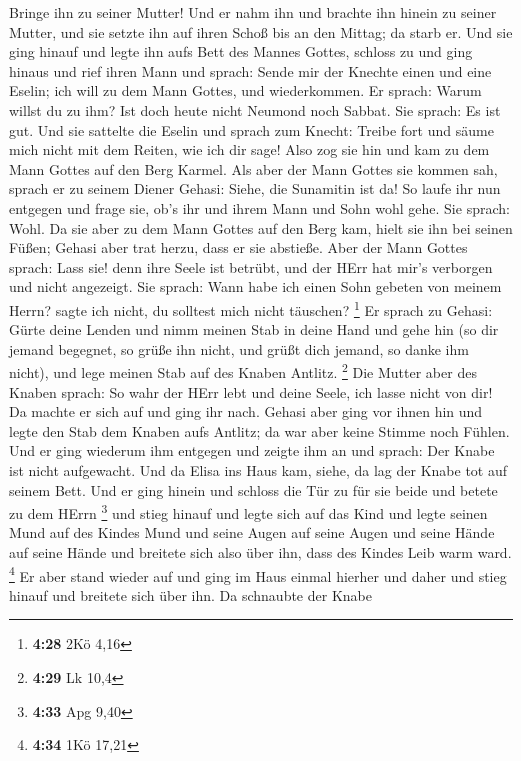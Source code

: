 Bringe ihn zu seiner Mutter!  Und er nahm ihn und brachte
ihn hinein zu seiner Mutter, und sie setzte ihn auf ihren Schoß bis an
den Mittag; da starb er.  Und sie ging hinauf und legte ihn
aufs Bett des Mannes Gottes, schloss zu und ging hinaus 
und rief ihren Mann und sprach: Sende mir der Knechte einen und eine
Eselin; ich will zu dem Mann Gottes, und wiederkommen.  Er
sprach: Warum willst du zu ihm? Ist doch heute nicht Neumond noch
Sabbat. Sie sprach: Es ist gut.  Und sie sattelte die
Eselin und sprach zum Knecht: Treibe fort und säume mich nicht mit dem
Reiten, wie ich dir sage!  Also zog sie hin und kam zu dem
Mann Gottes auf den Berg Karmel. Als aber der Mann Gottes sie kommen
sah, sprach er zu seinem Diener Gehasi: Siehe, die Sunamitin ist da!
 So laufe ihr nun entgegen und frage sie, ob's ihr und
ihrem Mann und Sohn wohl gehe. Sie sprach: Wohl.  Da sie
aber zu dem Mann Gottes auf den Berg kam, hielt sie ihn bei seinen
Füßen; Gehasi aber trat herzu, dass er sie abstieße. Aber der Mann
Gottes sprach: Lass sie! denn ihre Seele ist betrübt, und der HErr hat
mir's verborgen und nicht angezeigt.  Sie sprach: Wann habe
ich einen Sohn gebeten von meinem Herrn? sagte ich nicht, du solltest
mich nicht täuschen? \footnote{\textbf{4:28} 2Kö 4,16}  Er
sprach zu Gehasi: Gürte deine Lenden und nimm meinen Stab in deine Hand
und gehe hin (so dir jemand begegnet, so grüße ihn nicht, und grüßt dich
jemand, so danke ihm nicht), und lege meinen Stab auf des Knaben
Antlitz. \footnote{\textbf{4:29} Lk 10,4}  Die Mutter aber
des Knaben sprach: So wahr der HErr lebt und deine Seele, ich lasse
nicht von dir! Da machte er sich auf und ging ihr nach. 
Gehasi aber ging vor ihnen hin und legte den Stab dem Knaben aufs
Antlitz; da war aber keine Stimme noch Fühlen. Und er ging wiederum ihm
entgegen und zeigte ihm an und sprach: Der Knabe ist nicht aufgewacht.
 Und da Elisa ins Haus kam, siehe, da lag der Knabe tot auf
seinem Bett.  Und er ging hinein und schloss die Tür zu für
sie beide und betete zu dem HErrn \footnote{\textbf{4:33} Apg 9,40}
 und stieg hinauf und legte sich auf das Kind und legte
seinen Mund auf des Kindes Mund und seine Augen auf seine Augen und
seine Hände auf seine Hände und breitete sich also über ihn, dass des
Kindes Leib warm ward. \footnote{\textbf{4:34} 1Kö 17,21} 
Er aber stand wieder auf und ging im Haus einmal hierher und daher und
stieg hinauf und breitete sich über ihn. Da schnaubte der Knabe
